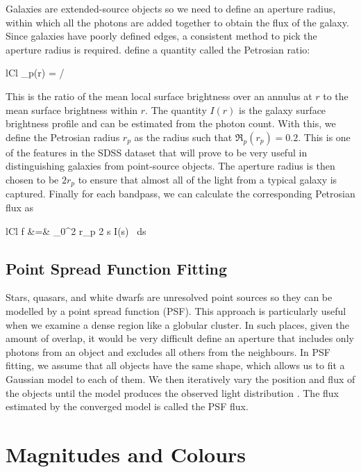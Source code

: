 Galaxies are extended-source objects so we need to define an aperture radius, within which
all the photons are added together to obtain the flux of the galaxy. Since galaxies have
poorly defined edges, a consistent method to pick the aperture radius is required.
 define a quantity called the Petrosian ratio:
	\begin{IEEEeqnarray*}{lCl}
		_p(r) = 
							\bigg/ 
	\end{IEEEeqnarray*}
This is the ratio of the mean local surface brightness over an annulus at $r$ to the mean
surface brightness within $r$. The quantity $I(r)$ is the galaxy surface brightness profile
and can be estimated from the photon count. With this, we define the Petrosian
radius $r_p$ as the radius such that $\mathfrak{R}_p(r_p) = 0.2$. This is one of the features
in the SDSS dataset that will prove to be very useful in distinguishing galaxies from
point-source objects. The aperture radius is then chosen to be $2r_p$ to ensure that almost
all of the light from a typical galaxy is captured. Finally for each bandpass, we can calculate
the corresponding Petrosian flux as
	\begin{IEEEeqnarray*}{lCl}
		f &=& \int_{0}^{2 r_p} 2 \pi s I(s) \, ds
	\end{IEEEeqnarray*}

\subsection{Point Spread Function Fitting} 
\label{sub:psf}

Stars, quasars, and white dwarfs are unresolved point sources so they can be modelled by a point
spread function (PSF). This approach is particularly useful when we examine a dense region like a
globular cluster. In such places, given the amount of overlap, it would be very difficult define an
aperture that includes only photons from an object and excludes all others from the neighbours. In
PSF fitting, we assume that all objects have the same shape, which allows us to fit a Gaussian model
to each of them. We then iteratively vary the position and flux of the objects until the model
produces the observed light distribution \cite[Chapter 10]{palmer01}. The flux estimated by the
converged model is called the PSF flux.

\section{Magnitudes and Colours} 
\label{sec:mag}

